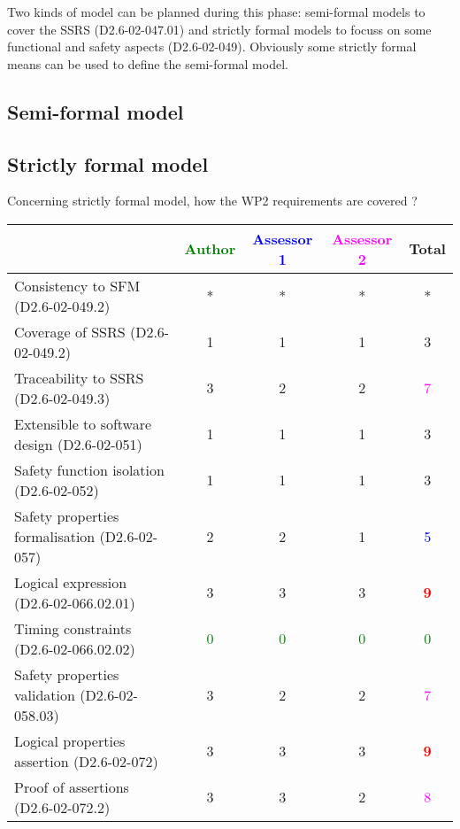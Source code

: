 Two kinds of model can be planned during this phase: semi-formal models to  cover the SSRS (D2.6-02-047.01) and strictly formal  models to  focuss on some functional and safety aspects (D2.6-02-049).  Obviously some strictly  formal means can be used to define the semi-formal  model.

\subsection{Semi-formal model}

\begin{comment}
Section has been skipped.
\end{comment}

\subsection{Strictly formal model}

Concerning strictly formal model, how the WP2 requirements are covered ?

\begin{tabular}{|l | c | c | c | c|}
\hline
& \textcolor{green}{Author} & \textcolor{blue}{Assessor 1} & \textcolor{magenta}{Assessor 2} & Total \\
\hline 
Consistency to SFM (D2.6-02-049.2) &* &* & *&  * \\
\hline
Coverage of SSRS (D2.6-02-049.2)  &1 &1 & 1   & 3     \\
\hline
Traceability to  SSRS (D2.6-02-049.3)  &3 &2 & 2   & \textcolor{magenta}{7} \\
\hline
Extensible to software design (D2.6-02-051)  &1 &1 & 1   & 3     \\
\hline
Safety function isolation (D2.6-02-052)  &1 &1 & 1   & 3    \\
\hline 
Safety properties formalisation (D2.6-02-057)  &2 &2 & 1   & \textcolor{blue}{5} \\
\hline
Logical expression (D2.6-02-066.02.01)  &3 &3 & 3   & \textcolor{red}{\textbf{9}} \\
\hline
Timing constraints (D2.6-02-066.02.02)  & \textcolor{green}{0}   & \textcolor{green}{0}   & \textcolor{green}{0} & \textcolor{green}{0} \\
\hline
Safety properties validation (D2.6-02-058.03)  &3 &2 & 2   & \textcolor{magenta}{7} \\
\hline
Logical properties assertion (D2.6-02-072)  &3 &3 & 3   & \textcolor{red}{\textbf{9}} \\
\hline
Proof of assertions (D2.6-02-072.2)  &3 &3 & 2   & \textcolor{magenta}{8} \\
\hline
\end{tabular}

